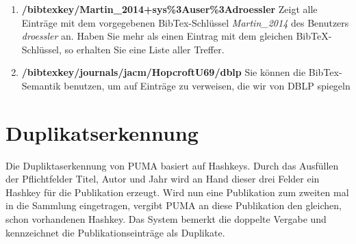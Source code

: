 \begin{enumerate}
    \item \textbf{/bibtexkey/Martin\_2014+sys\%3Auser\%3Adroessler} \newline
    Zeigt alle Einträge mit dem vorgegebenen BibTex-Schlüssel \textit{Martin\_2014} des Benutzers \textit{droessler} an. Haben Sie mehr als einen Eintrag mit dem gleichen BibTeX-Schlüssel, so erhalten Sie eine Liste aller Treffer.
    \item \textbf{/bibtexkey/journals/jacm/HopcroftU69/dblp} \newline
    Sie können die BibTex-Semantik benutzen, um auf Einträge zu verweisen, die wir von DBLP spiegeln  %
\end{enumerate}
\section{Duplikatserkennung} 
\label{sec:duplikat}
Die Dupliktaserkennung von PUMA basiert auf Hashkeys. Durch das Ausfüllen der Pflichtfelder Titel, Autor und Jahr wird an Hand dieser drei Felder ein Hashkey für die Publikation erzeugt. Wird nun eine Publikation zum zweiten mal in die Sammlung eingetragen, vergibt PUMA an diese Publikation den gleichen, schon vorhandenen Hashkey. Das System bemerkt die doppelte Vergabe und kennzeichnet die Publikationseinträge als Duplikate. 


